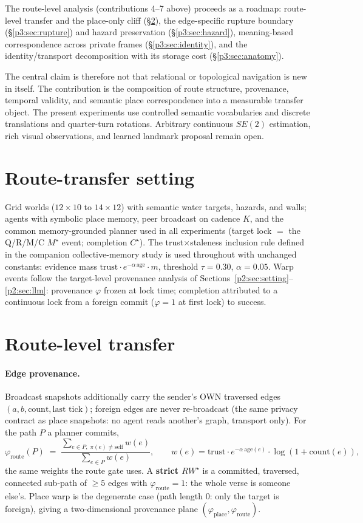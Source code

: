 \documentclass{article}
\newcommand{\rwstar}{RW^{\star}}
\newcommand{\mstar}{M^{\star}}
\newcommand{\cstar}{C^{\star}}
\newcommand{\phiroute}{\varphi_{\mathrm{route}}}
\begin{document}
The route-level analysis (contributions 4--7 above) proceeds as a
roadmap: route-level transfer and the place-only cliff
(\S\ref{p3:sec:route}), the edge-specific rupture boundary
(\S\ref{p3:sec:rupture}) and hazard preservation
(\S\ref{p3:sec:hazard}), meaning-based correspondence across private
frames (\S\ref{p3:sec:identity}), and the identity/transport
decomposition with its storage cost (\S\ref{p3:sec:anatomy}).

The central claim is therefore not that relational or topological
navigation is new in itself. The contribution is the composition of
route structure, provenance, temporal validity, and semantic place
correspondence into a measurable transfer object. The present
experiments use controlled semantic vocabularies and discrete
translations and quarter-turn rotations. Arbitrary continuous
$SE(2)$ estimation, rich visual observations, and learned landmark
proposal remain open.


\section{Route-transfer setting}
\label{p3:sec:setting}

Grid worlds ($12{\times}10$ to $14{\times}12$) with semantic water
targets, hazards, and walls; agents with symbolic place memory,
peer broadcast on cadence $K$, and the common memory-grounded planner
used in all experiments
(target lock $=$ the Q/R/M/C $\mstar$ event; completion $\cstar$).
The trust$\times$staleness inclusion rule defined in the companion collective-memory study \citep{songlines3} is used throughout with unchanged constants: evidence
mass $\text{trust}\cdot e^{-\alpha\,\text{age}}\cdot m$, threshold
$\tau{=}0.30$, $\alpha{=}0.05$. Warp events follow the target-level
provenance analysis of Sections~\ref{p2:sec:setting}--\ref{p2:sec:llm}: provenance $\varphi$ frozen at lock time; completion attributed
to a continuous lock from a foreign commit ($\varphi{=}1$ at first
lock) to success.


\section{Route-level transfer}
\label{p3:sec:route}

\paragraph{Edge provenance.} Broadcast snapshots additionally carry the
sender's OWN traversed edges $(a,b,\text{count},\text{last tick})$;
foreign edges are never re-broadcast (the same privacy contract as
place snapshots: no agent reads another's graph, transport only). For
the path $P$ a planner commits,
\[
\phiroute(P) \;=\;
\frac{\sum_{e\in P,\;\pi(e)\neq\mathrm{self}} w(e)}
     {\sum_{e\in P} w(e)},
\qquad w(e) = \text{trust}\cdot e^{-\alpha\,\text{age}(e)}\cdot
\log(1{+}\text{count}(e)),
\]
the same weights the route gate uses. A \textbf{strict $\rwstar$} is a
committed, traversed, connected sub-path of $\ge 5$ edges with
$\phiroute = 1$: the whole verse is someone else's. Place warp is the
degenerate case (path length $0$: only the target is foreign), giving
a two-dimensional provenance plane $(\varphi_{\mathrm{place}},
\phiroute)$.
\end{document}
